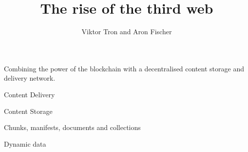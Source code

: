 \documentclass{beamer}
\title{The rise of the third web}
\author{Viktor Tron and Aron Fischer}
\begin{document}
\begin{frame}
 \titlepage
\end{frame}


\begin{frame}
 \tableofcontents[subsectionstyle=shaded/shaded,subsubsectionstyle=hide/hide]
\end{frame}

\begin{frame}
 Combining the power of the blockchain with a decentralised content storage and delivery network.
\end{frame}

\begin{section}{Content Delivery}

\end{section}

\begin{section}{Content Storage}
 
\end{section}

\begin{section}{Chunks, manifests, documents and collections}
 
\end{section}

\begin{section}{Dynamic data}
 
\end{section}
\end{document}
